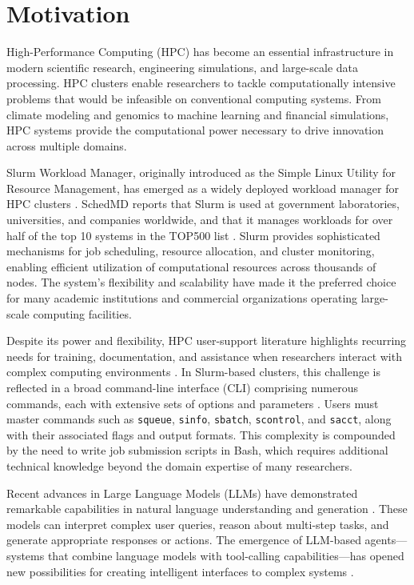 \section{Motivation}
\label{sec:motivation}

High-Performance Computing (HPC) has become an essential infrastructure in modern scientific research, engineering simulations, and large-scale data processing. HPC clusters enable researchers to tackle computationally intensive problems that would be infeasible on conventional computing systems. From climate modeling and genomics to machine learning and financial simulations, HPC systems provide the computational power necessary to drive innovation across multiple domains.

Slurm Workload Manager, originally introduced as the Simple Linux Utility for Resource Management, has emerged as a widely deployed workload manager for HPC clusters \cite{yoo2003slurm, slurm2024docs}. SchedMD reports that Slurm is used at government laboratories, universities, and companies worldwide, and that it manages workloads for over half of the top 10 systems in the TOP500 list \cite{schedmd2024slurm}. Slurm provides sophisticated mechanisms for job scheduling, resource allocation, and cluster monitoring, enabling efficient utilization of computational resources across thousands of nodes. The system's flexibility and scalability have made it the preferred choice for many academic institutions and commercial organizations operating large-scale computing facilities.

Despite its power and flexibility, HPC user-support literature highlights recurring needs for training, documentation, and assistance when researchers interact with complex computing environments \cite{sabin2020hpc}. In Slurm-based clusters, this challenge is reflected in a broad command-line interface (CLI) comprising numerous commands, each with extensive sets of options and parameters \cite{slurm2024docs}. Users must master commands such as \texttt{squeue}, \texttt{sinfo}, \texttt{sbatch}, \texttt{scontrol}, and \texttt{sacct}, along with their associated flags and output formats. This complexity is compounded by the need to write job submission scripts in Bash, which requires additional technical knowledge beyond the domain expertise of many researchers.

Recent advances in Large Language Models (LLMs) have demonstrated remarkable capabilities in natural language understanding and generation \cite{brown2020language, openai2023gpt4}. These models can interpret complex user queries, reason about multi-step tasks, and generate appropriate responses or actions. The emergence of LLM-based agents---systems that combine language models with tool-calling capabilities---has opened new possibilities for creating intelligent interfaces to complex systems \cite{xi2023rise, schick2023toolformer}.

